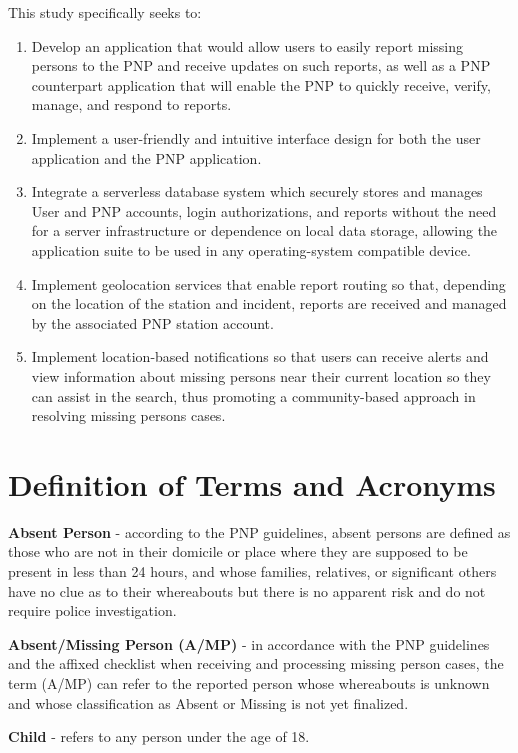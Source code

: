 This study specifically seeks to:

\begin{enumerate}
   \item Develop an application that would allow users to easily report missing persons to the PNP and receive updates on such reports, as well as a PNP counterpart application that will enable the PNP to quickly receive, verify, manage, and respond to reports.
   \item Implement a user-friendly and intuitive interface design for both the  user application and the PNP application.
   \item Integrate a serverless database system which securely stores and manages User and PNP accounts, login authorizations, and reports without the need for a server infrastructure or dependence on local data storage, allowing the application suite to be used in any operating-system compatible device.
   \item Implement geolocation services that enable report routing so that, depending on the location of the station and incident, reports are received and managed by the associated PNP station account.
   \item Implement location-based notifications so that users can receive alerts and view information about missing persons near their current location so they can assist in the search, thus promoting a community-based approach in resolving missing persons cases.
\end{enumerate}

\newpage
\section{Definition of Terms and Acronyms}

\textbf{Absent Person} - according to the PNP guidelines, absent persons are defined as those who are not in their domicile or place where they are supposed to be present in less than 24 hours, and whose families, relatives, or significant others have no clue as to their whereabouts but there is no apparent risk and do not require police investigation.

\textbf{Absent/Missing Person (\textbf{A/MP}) }- in accordance with the PNP guidelines and the affixed checklist when receiving and processing missing person cases, the term (A/MP) can refer to the reported person whose whereabouts is unknown and whose classification as Absent or Missing is not yet finalized.

\textbf{Child} - refers to any person under the age of 18.

